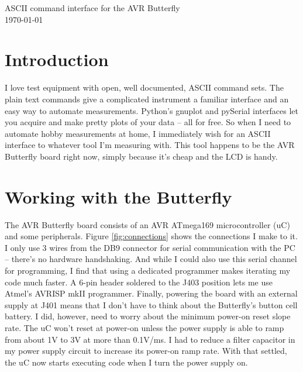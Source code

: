 
\graphicspath{
              {figs/} %
              {pngs/} %
}

\newcommand{\isdraft}{1} %
\doublespacing{} %






\begin{center}
	{\huge ASCII command interface for the AVR Butterfly}\\
	\today
\end{center}



\section{Introduction}
I love test equipment with open, well documented, ASCII command sets.  The plain text commands give a complicated instrument a familiar interface and an easy way to automate measurements.  Python's gnuplot and pySerial interfaces let you acquire and make pretty plots of your data -- all for free\cite{pyserial,gnuplot-py}. So when I need to automate hobby measurements at home, I immediately wish for an ASCII interface to whatever tool I'm measuring with.  This tool happens to be the AVR Butterfly board right now, simply because it's cheap and the LCD is handy.  

\clearpage
\section{Working with the Butterfly}
The AVR Butterfly board consists of an AVR ATmega169 microcontroller (uC) and some peripherals.  Figure \ref{fig:connections} shows the connections I make to it.  I only use 3 wires from the DB9 connector for serial communication with the PC -- there's no hardware handshaking.  And while I could also use this serial channel for programming, I find that using a dedicated programmer makes iterating my code much faster.  A 6-pin header soldered to the J403 position lets me use Atmel's AVRISP mkII programmer.  Finally, powering the board with an external supply at J401 means that I don't have to think about the Butterfly's button cell battery.  I did, however, need to worry about the minimum power-on reset slope rate.  The uC won't reset at power-on unless the power supply is able to ramp from about 1V to 3V at more than 0.1V/ms.  I had to reduce a filter capacitor in my power supply circuit to increase its power-on ramp rate.  With that settled, the uC now starts executing code when I turn the power supply on.

